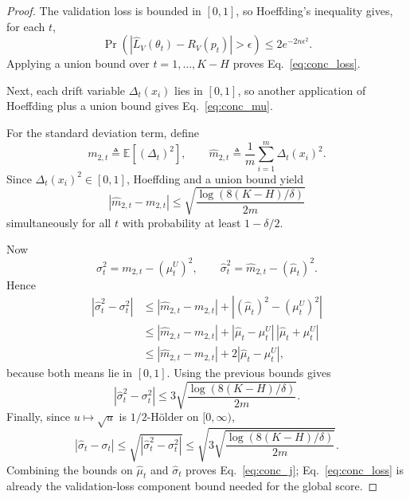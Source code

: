 \documentclass{article}
\newcommand{\EE}{\mathbb{E}}
\begin{document}
\begin{proof}
The validation loss is bounded in $[0,1]$, so Hoeffding's inequality gives, for each $t$,
\begin{equation}
    \Pr\!\left(
        \left| \hat L_V(\theta_t)-R_V(p_t) \right| > \epsilon
    \right)
    \le
    2e^{-2n\epsilon^2}.
\end{equation}
Applying a union bound over $t=1,\dots,K-H$ proves Eq.~\eqref{eq:conc_loss}.

Next, each drift variable $\Delta_t(x_i)$ lies in $[0,1]$, so another application of Hoeffding plus a union bound gives Eq.~\eqref{eq:conc_mu}.

For the standard deviation term, define
\begin{equation}
    m_{2,t} \triangleq \EE[(\Delta_t)^2],
    \qquad
    \hat m_{2,t} \triangleq \frac{1}{m}\sum_{i=1}^{m}\Delta_t(x_i)^2.
\end{equation}
Since $\Delta_t(x_i)^2\in[0,1]$, Hoeffding and a union bound yield
\begin{equation}
    |\hat m_{2,t}-m_{2,t}|
    \le
    \sqrt{\frac{\log(8(K-H)/\delta)}{2m}}
\end{equation}
simultaneously for all $t$ with probability at least $1-\delta/2$.

Now
\begin{equation}
    \sigma_t^2 = m_{2,t} - (\mu_t^U)^2,
    \qquad
    \hat \sigma_t^2 = \hat m_{2,t} - (\hat \mu_t)^2.
\end{equation}
Hence
\begin{align}
    |\hat \sigma_t^2 - \sigma_t^2|
    &\le
    |\hat m_{2,t}-m_{2,t}| + |(\hat \mu_t)^2-(\mu_t^U)^2| \\
    &\le
    |\hat m_{2,t}-m_{2,t}| + |\hat \mu_t-\mu_t^U|\,|\hat \mu_t+\mu_t^U| \\
    &\le
    |\hat m_{2,t}-m_{2,t}| + 2|\hat \mu_t-\mu_t^U|,
\end{align}
because both means lie in $[0,1]$. Using the previous bounds gives
\begin{equation}
    |\hat \sigma_t^2 - \sigma_t^2|
    \le
    3\sqrt{\frac{\log(8(K-H)/\delta)}{2m}}.
\end{equation}
Finally, since $u\mapsto \sqrt{u}$ is $1/2$-H\"older on $[0,\infty)$,
\begin{equation}
    |\hat \sigma_t - \sigma_t|
    \le
    \sqrt{|\hat \sigma_t^2 - \sigma_t^2|}
    \le
    \sqrt{
        3\sqrt{\frac{\log(8(K-H)/\delta)}{2m}}
    }.
\end{equation}
Combining the bounds on $\hat\mu_t$ and $\hat\sigma_t$ proves Eq.~\eqref{eq:conc_j}; Eq.~\eqref{eq:conc_loss} is already the validation-loss component bound needed for the global score.
\end{proof}
\end{document}
